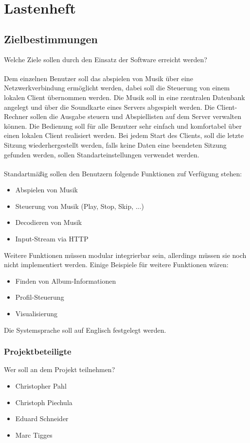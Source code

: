 \chapter{Lastenheft}
\section{Zielbestimmungen}
Welche Ziele sollen durch den Einsatz der Software erreicht werden?\ \\ \\
Dem einzelnen Benutzer soll das abspielen von Musik über eine Netzwerkverbindung ermöglicht
werden, dabei soll die Steuerung von einem lokalen Client übernommen werden. Die Musik soll
in eine rzentralen Datenbank angelegt und über die Soundkarte eines Servers abgespielt werden.
Die Client-Rechner sollen die Ausgabe steuern und Abspiellisten auf dem Server verwalten
können. Die Bedienung soll für alle Benutzer sehr einfach und komfortabel über einen lokalen
Client realisiert werden. Bei jedem Start des Clients, soll die letzte Sitzung wiederhergestellt
werden, falls keine Daten eine beendeten Sitzung gefunden werden, sollen Standarteinstellungen
verwendet werden.\ \\ \\
Standartmäßig sollen den Benutzern folgende Funktionen zuf Verfügung stehen:
\renewcommand{\labelitemi}{•}
\begin{itemize}
        \item Abspielen von Musik
        \item Steuerung von Musik (Play, Stop, Skip, ...)
        \item Decodieren von Musik
        \item Input-Stream via HTTP
\end{itemize}
Weitere Funktionen müssen modular integrierbar sein, allerdings müssen sie noch nicht implementiert
werden. Einige Beispiele für weitere Funktionen wären:
\begin{itemize}
	\item Finden von Album-Informationen
	\item Profil-Steuerung
	\item Visualisierung
\end{itemize}
Die Systemsprache soll auf Englisch festgelegt werden.
\subsection{Projektbeteiligte}
Wer soll an dem Projekt teilnehmen?
\begin{itemize}
	\item Christopher Pahl
	\item Christoph Piechula
	\item Eduard Schneider
	\item Marc Tigges
\end{itemize}
